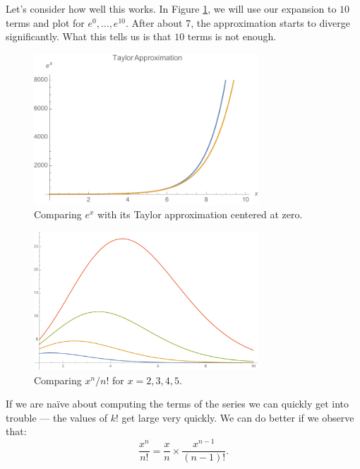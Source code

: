 \documentclass[11pt]{article}
\begin{document}
Let's consider how well this works. In Figure \ref{exp}, we will
use our expansion to $10$ terms and plot for $e^0 , \ldots  ,
e^{10}$. After about $7$, the approximation starts to diverge
significantly. What this tells us is that $10$ terms is not enough.

\begin{figure}[hbt]
\begin{centering}
\includegraphics[width=0.75\textwidth]{Exp}
\caption{Comparing $e^x$ with its Taylor approximation centered at zero.}\label{exp}
\end{centering}
\end{figure}



\begin{figure}[hbt]
\begin{centering}
\includegraphics[width=0.75\textwidth]{Growth}
\caption{Comparing ${x^n}/{n!}$ for $x=2,3,4,5$.}\label{growth}
\end{centering}
\end{figure}
If we are na\"ive about computing the terms of the series we can
quickly get into trouble --- the values of $k!$ get large very quickly.
We can do better if we observe that:
$$
\frac{x^n}{n!} = \frac{x}{n} \times \frac{x^{n-1}}{(n-1)!} .
$$
\end{document}
